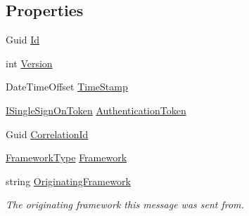 \subsection*{Properties}
\begin{DoxyCompactItemize}
\item 
Guid \hyperlink{classCqrs_1_1Tests_1_1Substitutes_1_1TestAggregateDidSomething_ac9a5ee87be68aa399f3a9d62e1e4e7ae_ac9a5ee87be68aa399f3a9d62e1e4e7ae}{Id}
\item 
int \hyperlink{classCqrs_1_1Tests_1_1Substitutes_1_1TestAggregateDidSomething_a87be89d49da8a13dd5adc5f4212113d1_a87be89d49da8a13dd5adc5f4212113d1}{Version}
\item 
Date\+Time\+Offset \hyperlink{classCqrs_1_1Tests_1_1Substitutes_1_1TestAggregateDidSomething_af609de5278f3842a61a727bd20a4f22f_af609de5278f3842a61a727bd20a4f22f}{Time\+Stamp}
\item 
\hyperlink{interfaceCqrs_1_1Authentication_1_1ISingleSignOnToken}{I\+Single\+Sign\+On\+Token} \hyperlink{classCqrs_1_1Tests_1_1Substitutes_1_1TestAggregateDidSomething_a1ab4e87506efc47a791b28a1e6e15fd8_a1ab4e87506efc47a791b28a1e6e15fd8}{Authentication\+Token}
\item 
Guid \hyperlink{classCqrs_1_1Tests_1_1Substitutes_1_1TestAggregateDidSomething_a859dfc01b70a90392891e5fbb4b6b1ee_a859dfc01b70a90392891e5fbb4b6b1ee}{Correlation\+Id}
\item 
\hyperlink{namespaceCqrs_1_1Messages_af06a7e6cd2609043d0f2f5f3419f81e3_af06a7e6cd2609043d0f2f5f3419f81e3}{Framework\+Type} \hyperlink{classCqrs_1_1Tests_1_1Substitutes_1_1TestAggregateDidSomething_a6d25ea89af11405c8ada20b841a1fb7a_a6d25ea89af11405c8ada20b841a1fb7a}{Framework}
\item 
string \hyperlink{classCqrs_1_1Tests_1_1Substitutes_1_1TestAggregateDidSomething_ac1a52622a285f1c4d2e226fbb4c91c09_ac1a52622a285f1c4d2e226fbb4c91c09}{Originating\+Framework}
\begin{DoxyCompactList}\small\item\em The originating framework this message was sent from. \end{DoxyCompactList}\item 

\end{DoxyCompactItemize}
